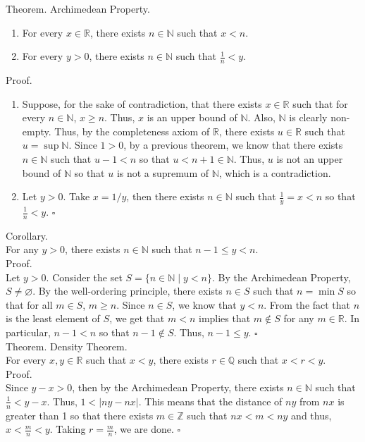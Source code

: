 \documentclass[twocolumn]{article}
\newcommand{\qed}{$\square$}
\newcommand{\br}{\vspace{\baselineskip}}
\let\emptyset\varnothing
\newcommand{\naturals}{\mathbb{N}}
\newcommand{\integers}{\mathbb{Z}}
\newcommand{\rationals}{\mathbb{Q}}
\newcommand{\reals}{\mathbb{R}}
\begin{document}
Theorem. Archimedean Property.
\begin{enumerate}
	\item
		For every $x \in \reals$, there exists $n \in \naturals$ such that $x < n$.
	\item
		For every $y > 0$, there exists $n \in \naturals$ such that $\frac{1}{n} < y$.
\end{enumerate}
Proof.
\begin{enumerate}
	\item
		Suppose, for the sake of contradiction, that there exists $x \in \reals$ such that for every $n \in \naturals$, $x \geq n$. Thus, $x$ is an upper bound of $\naturals$. Also, $\naturals$ is clearly non-empty. Thus, by the completeness axiom of $\reals$, there exists $u \in \reals$ such that $u = \sup \naturals$. Since $1 > 0$, by a previous theorem, we know that there exists $n \in \naturals$ such that $u - 1 < n$ so that $u < n + 1 \in \naturals$. Thus, $u$ is not an upper bound of $\naturals$ so that $u$ is not a supremum of $\naturals$, which is a contradiction.
	\item
		Let $y > 0$. Take $x = 1 / y$, then there exists $n \in \naturals$ such that $\frac{1}{y} = x < n$ so that $\frac{1}{n} < y$. \qed
\end{enumerate} \br

Corollary. \\
For any $y > 0$, there exists $n \in \naturals$ such that $n - 1 \leq y < n$. \\
Proof. \\
Let $y > 0$. Consider the set $S = \{n \in \naturals \mid y < n \}$. By the Archimedean Property, $S \neq \emptyset$. By the well-ordering principle, there exists $n \in S$ such that $n = \min S$ so that for all $m \in S$, $m \geq n$. Since $n \in S$, we know that $y < n$. From the fact that $n$ is the least element of $S$, we get that $m < n$ implies that $m \not\in S$ for any $m \in \reals$. In particular, $n - 1 < n$ so that $n - 1 \not\in S$. Thus, $n - 1 \leq y$. \qed \\

Theorem. Density Theorem. \\
For every $x, y \in \reals$ such that $x < y$, there exists $r \in \rationals$ such that $x < r < y$. \\
Proof. \\
Since $y - x > 0$, then by the Archimedean Property, there exists $n \in \naturals$ such that $\frac{1}{n} < y - x$. Thus, $1 < |ny - nx|$. This means that the distance of $ny$ from $nx$ is greater than 1 so that there exists $m \in \integers$ such that $nx < m < ny$ and thus, $x < \frac{m}{n} < y$. Taking $r = \frac{m}{n}$, we are done. \qed \\
\end{document}

